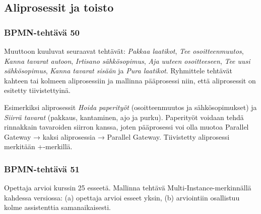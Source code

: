 \documentclass[
  finnish,
  letterpaper,
  DIV=11,
  numbers=noendperiod,
  oneside]{scrreprt}
\begin{document}
\subsection{Aliprosessit ja toisto}\label{aliprosessit-ja-toisto}

\subsubsection{BPMN-tehtävä 50}\label{bpmn-tehtuxe4vuxe4-50}

Muuttoon kuuluvat seuraavat tehtävät: \emph{Pakkaa laatikot}, \emph{Tee
osoitteenmuutos}, \emph{Kanna tavarat autoon}, \emph{Irtisano
sähkösopimus}, \emph{Aja uuteen osoitteeseen}, \emph{Tee uusi
sähkösopimus}, \emph{Kanna tavarat sisään} ja \emph{Pura laatikot}.
Ryhmittele tehtävät kahteen tai kolmeen aliprosessiin ja mallinna
pääprosessi niin, että aliprosessit on esitetty tiivistettyinä.

\begin{tcolorbox}[enhanced jigsaw, arc=.35mm, bottomrule=.15mm, bottomtitle=1mm, breakable, colback=white, colbacktitle=quarto-callout-tip-color!10!white, colframe=quarto-callout-tip-color-frame, coltitle=black, left=2mm, leftrule=.75mm, opacityback=0, opacitybacktitle=0.6, rightrule=.15mm, title=\textcolor{quarto-callout-tip-color}{\faLightbulb}\hspace{0.5em}{Malliratkaisu}, titlerule=0mm, toprule=.15mm, toptitle=1mm]

Esimerkiksi aliprosessit \emph{Hoida paperityöt} (osoitteenmuutos ja
sähkösopimukset) ja \emph{Siirrä tavarat} (pakkaus, kantaminen, ajo ja
purku). Paperityöt voidaan tehdä rinnakkain tavaroiden siirron kanssa,
joten pääprosessi voi olla muotoa Parallel Gateway → kaksi aliprosessia
→ Parallel Gateway. Tiivistetty aliprosessi merkitään +-merkillä.

\end{tcolorbox}

\subsubsection{BPMN-tehtävä 51}\label{bpmn-tehtuxe4vuxe4-51}

Opettaja arvioi kurssin 25 esseetä. Mallinna tehtävä
Multi-Instance-merkinnällä kahdessa versiossa: (a) opettaja arvioi
esseet yksin, (b) arviointiin osallistuu kolme assistenttia
samanaikaisesti.
\end{document}
